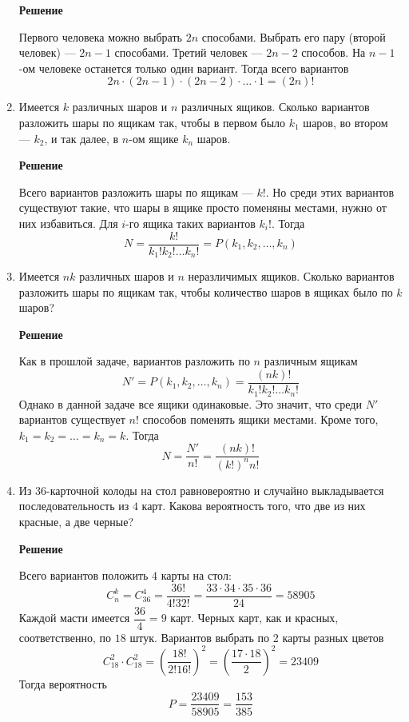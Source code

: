 \documentclass[12pt]{article}
\begin{document}
\begin{enumerate}[label={\textbf{\arabic{section}.\arabic*}}]
		\textbf{Решение}
		
		Первого человека можно выбрать $2n$ способами. Выбрать его пару (второй человек) --- $2n-1$ способами. Третий человек --- $2n-2$ способов. На $n-1$-ом человеке останется только один вариант. Тогда всего вариантов
		$$
		2n\cdot(2n-1)\cdot(2n-2)\cdot\dots\cdot1 = (2n)!
		$$
		
		\item Имеется $k$ различных шаров и $n$ различных ящиков. Сколько вариантов разложить шары по ящикам так, чтобы в первом было $k_1$ шаров, во втором --- $k_2$, и так далее, в $n$-ом ящике $k_n$ шаров.
		
		\textbf{Решение}
		
		Всего вариантов разложить шары по ящикам --- $k!$. Но среди этих вариантов существуют такие, что шары в ящике просто поменяны местами, нужно от них избавиться. Для $i$-го ящика таких вариантов $k_i!$. Тогда
		$$
		N = \frac{k!}{k_1!k_2!\dots k_n!} = P(k_1,k_2,\dots,k_n)
		$$
		
		\item Имеется $nk$ различных шаров и $n$ неразличимых ящиков. Сколько вариантов разложить шары по ящикам так, чтобы количество шаров в ящиках было по $k$ шаров?
		
		\textbf{Решение}
		
		Как в прошлой задаче, вариантов разложить по $n$ различным ящикам
		$$
		N' = P(k_1,k_2,\dots,k_n) = \frac{(nk)!}{k_1!k_2!\dots k_n!}
		$$
		Однако в данной задаче все ящики одинаковые. Это значит, что среди $N'$ вариантов существует $n!$ способов поменять ящики местами. Кроме того, $k_1 = k_2 =\dots = k_n = k$. Тогда
		$$
		N = \frac{N'}{n!} = \frac{(nk)!}{(k!)^nn!}
		$$
		
		\item Из $36$-карточной колоды на стол равновероятно и случайно выкладывается последовательность из $4$ карт. Какова вероятность того, что две из них красные, а две черные?
		
		\textbf{Решение}
		
		Всего вариантов положить $4$ карты на стол:
		$$
		C_n^k = C_{36}^4 = \frac{36!}{4!32!} = \frac{33\cdot34\cdot35\cdot36}{24} = 58905
		$$
		Каждой масти имеется $\dfrac{36}{4} = 9$ карт. Черных карт, как и красных, соответственно, по $18$ штук. Вариантов выбрать по 2 карты разных цветов
		$$
		C_{18}^2\cdot C_{18}^2 = \left(\frac{18!}{2!16!}\right)^2 = \left(\frac{17\cdot18}{2}\right)^2 = 23409 
		$$
		Тогда вероятность
		$$
		P = \frac{23409}{58905} = \frac{153}{385}
		$$
		

\end{enumerate}
\end{document}
